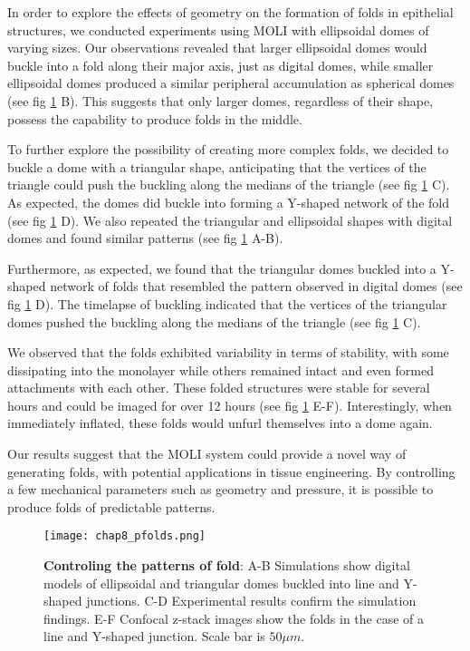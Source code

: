 In order to explore the effects of geometry on the formation of folds in epithelial structures, we conducted experiments using MOLI with ellipsoidal domes of varying sizes. Our observations revealed that larger ellipsoidal domes would buckle into a fold along their major axis, just as digital domes, while smaller ellipsoidal domes produced a similar peripheral accumulation as spherical domes (see fig \ref{fig_8_7} B). This suggests that only larger domes, regardless of their shape, possess the capability to produce folds in the middle.
 
To further explore the possibility of creating more complex folds, we decided to buckle a dome with a triangular shape, anticipating that the vertices of the triangle could push the buckling along the medians of the triangle (see fig \ref{fig_8_7} C). As expected, the domes did buckle into forming a Y-shaped network of the fold (see fig \ref{fig_8_7} D). We also repeated the triangular and ellipsoidal shapes with digital domes and found similar patterns (see fig \ref{fig_8_7} A-B).

Furthermore, as expected, we found that the triangular domes buckled into a Y-shaped network of folds that resembled the pattern observed in digital domes (see fig \ref{fig_8_7} D). The timelapse of buckling indicated that the vertices of the triangular domes  pushed the buckling along the medians of the triangle (see fig \ref{fig_8_7} C).

We observed that the folds exhibited variability in terms of stability, with some dissipating into the monolayer while others remained intact and even formed attachments with each other. These folded structures were stable for several hours and could be imaged for over 12 hours (see fig \ref{fig_8_7} E-F). Interestingly, when immediately inflated, these folds would unfurl themselves into a dome again.

Our results suggest that the MOLI system could provide a novel way of generating folds, with potential applications in tissue engineering. By controlling a few mechanical parameters such as geometry and pressure, it is possible to produce folds of predictable patterns.


\begin{figure}
	\centering
	\texttt{[image: chap8\_pfolds.png]}
	\caption{\label{fig_8_7} \textbf{Controling the patterns of fold}: A-B Simulations show digital models of ellipsoidal and triangular domes buckled into line and Y-shaped junctions. C-D Experimental results confirm the simulation findings. E-F Confocal z-stack images show the folds in the case of a line and Y-shaped junction. Scale bar is $50\mu m$.	}
\end{figure}


